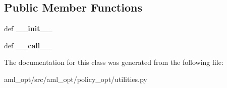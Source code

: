 \subsection*{Public Member Functions}
\begin{DoxyCompactItemize}
\item 
\hypertarget{classaml__opt_1_1policy__opt_1_1utilities_1_1_tf_function_ad5f4f83dee12c8b09d227246ec545e5c}{def {\bfseries \-\_\-\-\_\-init\-\_\-\-\_\-}}\label{classaml__opt_1_1policy__opt_1_1utilities_1_1_tf_function_ad5f4f83dee12c8b09d227246ec545e5c}

\item 
\hypertarget{classaml__opt_1_1policy__opt_1_1utilities_1_1_tf_function_a82c2ba02491309999ef8f8c4526095fb}{def {\bfseries \-\_\-\-\_\-call\-\_\-\-\_\-}}\label{classaml__opt_1_1policy__opt_1_1utilities_1_1_tf_function_a82c2ba02491309999ef8f8c4526095fb}

\end{DoxyCompactItemize}


The documentation for this class was generated from the following file\-:\begin{DoxyCompactItemize}
\item 
aml\-\_\-opt/src/aml\-\_\-opt/policy\-\_\-opt/utilities.\-py\end{DoxyCompactItemize}
